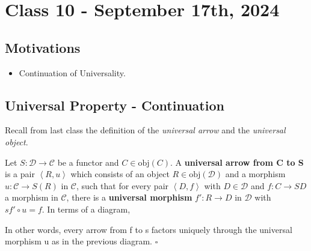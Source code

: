 \documentclass[../category_theory.tex]{subfiles}
\begin{document}
\section{Class 10 - September 17th, 2024}
\subsection{Motivations}
\begin{itemize}
	\item Continuation of Universality.
\end{itemize}
\subsection{Universal Property - Continuation}
Recall from last class the definition of the \textit{universal arrow} and the \textit{universal object}.

\begin{def*}
	Let \(S:\mathcal{D}\rightarrow \mathcal{C}\) be a functor and \(C\in \mathrm{obj}(C)\). A \textbf{universal arrow from C to S} is a pair \(\left< R, u \right>\) which consists of an object \(R\in \mathrm{obj}(\mathcal{D})\) and a morphism \(u:\mathcal{C}\rightarrow S(R)\) in \(\mathcal{C}\), such that for every pair \(\left< D, f \right>\) with \(D\in \mathcal{D}\) and \(f:C\rightarrow SD\) a morphism in \(\mathcal{C}\), there is a \textbf{universal morphism} \(f':R\rightarrow D\) in \(\mathcal{D}\) with \(sf'\circ u = f\). In terms of a diagram,
	\begin{center}
	\end{center}
	In other words, every arrow from f to s factors uniquely through the universal morphism u as in the previous diagram. \(\square\)
\end{def*}
\end{document}

